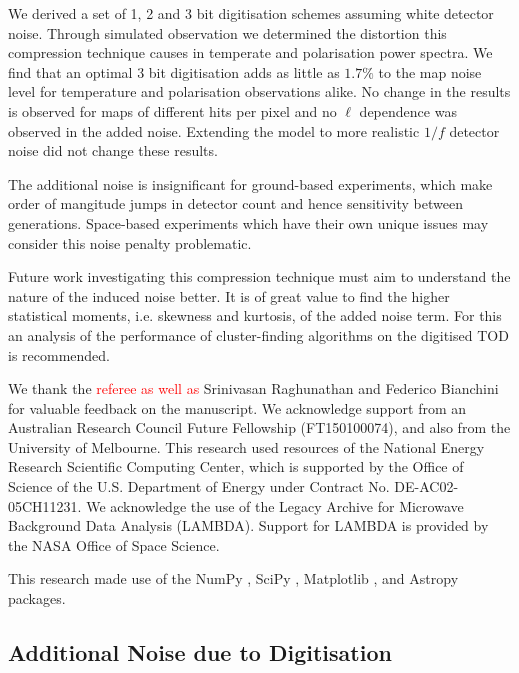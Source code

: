 \documentclass[apj]{emulateapj}
\newcommand{\changed}[1]{\textcolor{Red}{#1}}
\begin{document}
We derived a set of 1, 2 and 3 bit digitisation schemes assuming white detector noise. Through simulated observation we determined the distortion this compression technique causes in temperate and polarisation power spectra. We find that an optimal 3 bit digitisation adds as little as $1.7\%$ to the map noise level for temperature and polarisation observations alike. No change in the results is observed for maps of different hits per pixel and no $\ell$ dependence was observed in the added noise. Extending the model to more realistic $1/f$ detector noise did not change these results.

The additional noise is insignificant for ground-based experiments, which make order of mangitude jumps in detector count and hence sensitivity between generations. Space-based experiments which have their own unique issues may consider this noise penalty problematic.

Future work investigating this compression technique must aim to understand the nature of the induced noise better. It is of great value to find the higher statistical moments, i.e. skewness and kurtosis, of the added noise term. For this an analysis of the performance of cluster-finding algorithms on the digitised TOD is recommended.

\acknowledgments %


We thank the \changed{referee as well as} Srinivasan Raghunathan and Federico Bianchini for valuable feedback on the manuscript. 
We acknowledge support from an Australian Research Council Future Fellowship (FT150100074), and also from the University of Melbourne. 
This research used resources of the National Energy Research Scientific Computing Center, which is supported by the Office of Science of the U.S. Department of Energy under Contract No. DE-AC02-05CH11231. 
We acknowledge the use of the Legacy Archive for Microwave Background Data Analysis (LAMBDA). Support for LAMBDA is provided by the NASA Office of Space Science.


This research made use of the NumPy \citep{numpy}, SciPy \citep{scipy}, Matplotlib \citep{matplotlib}, and Astropy \citep{astropy} packages.

\newpage

\appendix

\subsection{Additional Noise due to Digitisation}
\label{subsec:appendixnoisetables}
\end{document}
